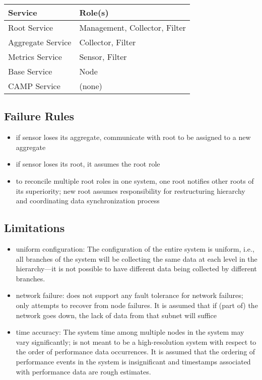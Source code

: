 \begin{tabular}{|l|l|}

\hline
\textbf{Service} & \textbf{Role(s)} \\
\hline
Root Service & Management, Collector, Filter \\
\hline
Aggregate Service & Collector, Filter \\
\hline
Metrics Service & Sensor, Filter \\
\hline
Base Service & Node \\
\hline
CAMP Service & (none) \\
\hline

\end{tabular}

\subsection{Failure Rules}

\begin{itemize}

\item if sensor loses its aggregate, communicate with root to be assigned to a new aggregate

\item if sensor loses its root, it assumes the root role

\item to reconcile multiple root roles in one system, one root notifies other roots of its superiority; new root assumes
responsibility for restructuring hierarchy and coordinating data synchronization process

\end{itemize}

\subsection{Limitations}

\begin{itemize}

\item uniform configuration: The configuration of the entire system is uniform, i.e., all branches of the system will be
collecting the same data at each level in the hierarchy---it is not possible to have different data being collected by
different branches.

\item network failure: \dcamp does not support any fault tolerance for network failures; \dcamp only attempts to recover
from node failures. It is assumed that if (part of) the network goes down, the lack of data from that subnet will
suffice

\item time accuracy: The system time among multiple nodes in the system may vary significantly; \dcamp is not meant to
be a high-resolution system with respect to the order of performance data occurrences. It is assumed that the ordering
of performance events in the system is insignificant and timestamps associated with performance data are rough
estimates.

\end{itemize}

